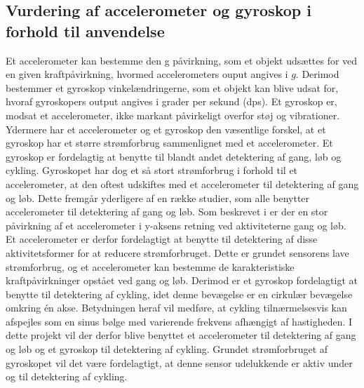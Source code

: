\subsection{Vurdering af accelerometer og gyroskop i forhold til anvendelse}\label{acc_og_gyro}
Et accelerometer kan bestemme den g påvirkning, som et objekt udsættes for ved en given kraftpåvirkning, hvormed accelerometers ouput angives i $g$. Derimod bestemmer et gyroskop vinkelændringerne, som et objekt kan blive udsat for, hvoraf gyroskopers output angives i grader per sekund (dps). Et gyroskop er, modsat et accelerometer, ikke markant påvirkeligt overfor støj og vibrationer. \citep{Goodrich2013,TittertonWeston2004,LuingeVeltink2005} \newline
Ydermere har et accelerometer og et gyroskop den væsentlige forskel, at et gyroskop har et større strømforbrug sammenlignet med et accelerometer. Et gyroskop er fordelagtig at benytte til blandt andet detektering af gang, løb og cykling. Gyroskopet har dog et så stort strømforbrug i forhold til et accelerometer, at den oftest udskiftes med et accelerometer til detektering af gang og løb. Dette fremgår yderligere af en række studier, som alle benytter accelerometer til detektering af gang og løb. \citep{Rueterbories2010,Sparkfun,ClelandKikhia2013} \newline
Som beskrevet i  er der en stor påvirkning af et accelerometer i y-aksens retning ved aktiviteterne gang og løb. Et accelerometer er derfor fordelagtigt at benytte til detektering af disse aktivitetsformer for at reducere strømforbruget. Dette er grundet sensorens lave strømforbrug, og et accelerometer kan bestemme de karakteristiske kraftpåvirkninger opstået ved gang og løb. Derimod er et gyroskop fordelagtigt at benytte til detektering af cykling, idet denne bevægelse er en cirkulær bevægelse omkring én akse. Betydningen heraf vil medføre, at cykling tilnærmelsesvis kan afspejles som en sinus bølge med varierende frekvens afhængigt af hastigheden. \citep{TittertonWeston2004,LuingeVeltink2005} \newline
I dette projekt vil der derfor blive benyttet et accelerometer til detektering af gang og løb og et gyroskop til detektering af cykling. Grundet strømforbruget af gyroskopet vil det være fordelagtigt, at denne sensor udelukkende er aktiv under og til detektering af cykling.%
